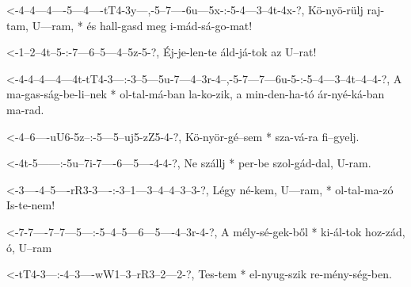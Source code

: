  {<-4--4---4----5---4----tT4-3y---,-5--7----6u---5x-:-5-4---3--4t-4x-?,}
  {  Kö-nyö-rülj raj-tam, U---ram, * és hall-gasd meg  i-mád-sá-go-mat!}

  {<-1--2--4t--5-:-7---6--5---4--5z-5-?,}
  {  Éj-je-len-te  áld-já-tok az U--rat!}

  {<-4-4--4---4---4t-tT4-3---:-3--5---5u-7---4--3r-4--,-5-7---7---6u-5-:-5--4---3--4t--4--4-?,}
  {  A ma-gas-ság-be-li--nek * ol-tal-má-ban la-ko-zik, a min-den-ha-tó  ár-nyé-ká-ban ma-rad.}

  {<-4--6----uU6-5z--:-5---5--uj5-zZ5-4-?,}
  {  Kö-nyör-gé--sem * sza-vá-ra  fi--gyelj.}

  {<-4t-5------:-5u--7i-7----6---5----4-4-?,}
  {  Ne szállj * per-be szol-gád-dal, U-ram.}

  {<-3----4--5----rR3-3----:-3--1---3--4--4--3--3-?,}
  {  Légy né-kem, U---ram, * ol-tal-ma-zó Is-te-nem!}

  {<-7-7----7--7---5---:-5--4--5---6---5----4--3r-4-?,}
  {  A mély-sé-gek-ből * ki-ál-tok hoz-zád, ó, U--ram}

  {<-tT4-3---:-4--3----wW1--3--rR3--2---2-?,}
  {  Tes-tem * el-nyug-szik re-mény-ség-ben.}

